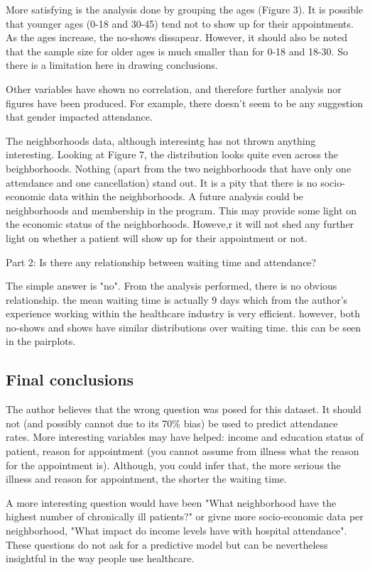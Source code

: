 \documentclass[11pt]{article}
\begin{document}
More satisfying is the analysis done by grouping the ages (Figure 3). It
is possible that younger ages (0-18 and 30-45) tend not to show up for
their appointments. As the ages increase, the no-shows dissapear.
However, it should also be noted that the sample size for older ages is
much smaller than for 0-18 and 18-30. So there is a limitation here in
drawing conclusions.

Other variables have shown no correlation, and therefore further
analysis nor figures have been produced. For example, there doesn't seem
to be any suggestion that gender impacted attendance.

The neighborhoods data, although interesintg has not thrown anything
interesting. Looking at Figure 7, the distribution looks quite even
across the beighborhoods. Nothing (apart from the two neighborhoods that
have only one attendance and one cancellation) stand out. It is a pity
that there is no socio-economic data within the neighborhoods. A future
analysis could be neighborhoods and membership in the program. This may
provide some light on the economic status of the neighborhoods. Howeve,r
it will not shed any further light on whether a patient will show up for
their appointment or not.

Part 2: Is there any relationship between waiting time and attendance?

The simple answer is "no". From the analysis performed, there is no
obvious relationship. the mean waiting time is actually 9 days which
from the author's experience working within the healthcare industry is
very efficient. however, both no-shows and shows have similar
distributions over waiting time. this can be seen in the pairplots.

\subsection{Final conclusions}\label{final-conclusions}

The author believes that the wrong question was posed for this dataset.
It should not (and possibly cannot due to its 70\% bias) be used to
predict attendance rates. More interesting variables may have helped:
income and education status of patient, reason for appointment (you
cannot assume from illness what the reason for the appointment is).
Although, you could infer that, the more serious the illness and reason
for appointment, the shorter the waiting time.

A more interesting question would have been "What neighborhood have the
highest number of chronically ill patients?" or givne more
socio-economic data per neighborhood, "What impact do income levels have
with hospital attendance". These questions do not ask for a predictive
model but can be nevertheless insightful in the way people use
healthcare.


    
    
    
    
\end{document}
